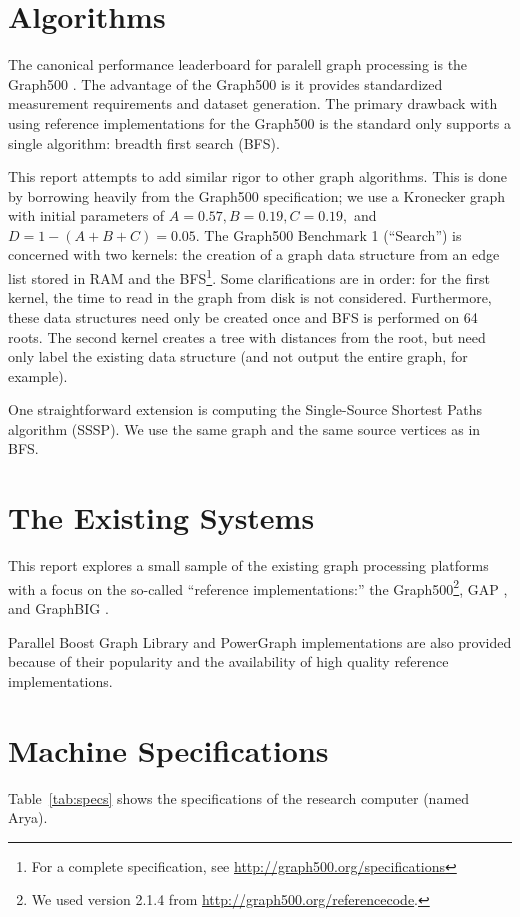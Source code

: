 \documentclass[conference]{IEEEtran}
\begin{document}
\section{Algorithms}
The canonical performance leaderboard for paralell graph processing is the Graph500 \cite{Murphy:2010:Graph500}. The advantage of the Graph500 is it provides standardized measurement requirements and dataset generation. The primary drawback with using reference implementations for the Graph500 is the standard only supports a single algorithm: breadth first search (BFS).

This report attempts to add similar rigor to other graph algorithms. This is done by borrowing heavily from the Graph500 specification; we use a Kronecker graph \cite{Leskovec:2010:Kronecker} with initial parameters of $A = 0.57, B = 0.19,
C = 0.19,$ and $D = 1-(A+B+C) = 0.05$. The Graph500 Benchmark 1 (``Search'') is concerned with two kernels: the creation of a graph data structure from an edge list stored in RAM and the BFS\footnote{For a complete specification, see \url{http://graph500.org/specifications}}. Some clarifications are in order: for the first kernel, the time to read in the graph from disk is not considered. Furthermore, these data structures need only be created once and BFS is performed on 64 roots. The second kernel creates a tree with distances from the root, but need only label the existing data structure (and not output the entire graph, for example).

One straightforward extension is computing the Single-Source Shortest Paths algorithm (SSSP). We use the same graph and the same source vertices as in BFS.

\section{The Existing Systems}
This report explores a small sample of the existing graph processing platforms with a focus on the so-called ``reference implementations:'' the Graph500\footnote{We used version 2.1.4 from \url{http://graph500.org/referencecode}.}, GAP \cite{Beamer:2015:GAPBench}, and GraphBIG \cite{Nai:2015:Graphbig}.

Parallel Boost Graph Library \cite{Gregor:2005:PBGL} and PowerGraph \cite{Gonzalez:2012:Powergraph} implementations are also provided because of their popularity and the availability of high quality reference implementations.


\section{Machine Specifications}
Table~\ref{tab:specs} shows the specifications of the research computer (named Arya).
\end{document}
